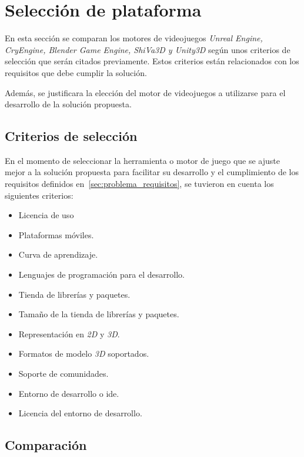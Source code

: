 \section{Selección de plataforma}
\label{sec:seleccion_plataforma}

En esta sección se comparan los motores de videojuegos \textit{Unreal Engine, CryEngine, Blender Game Engine, ShiVa3D y Unity3D} según unos criterios de selección que serán citados previamente. Estos criterios están relacionados
con los requisitos que debe cumplir la solución.

Además, se justificara la elección del motor de videojuegos a utilizarse para el desarrollo de la solución propuesta.

\subsection{Criterios de selección}

En el momento de seleccionar la herramienta o motor de juego que se ajuste mejor
a la solución propuesta para facilitar su desarrollo y el cumplimiento de los
requisitos definidos en~\ref{sec:problema_requisitos}, se tuvieron en cuenta los
siguientes criterios:


\begin{itemize}
\item Licencia de uso
\item Plataformas móviles.
\item Curva de aprendizaje.
\item Lenguajes de programación para el desarrollo.
\item Tienda de librerías y paquetes.
\item Tamaño de la tienda de librerías y paquetes.
\item Representación en \textit{2D} y \textit{3D}.
\item Formatos de modelo \textit{3D} soportados.
\item Soporte de comunidades.
\item Entorno de desarrollo o \Gls{ide}.
\item Licencia del entorno de desarrollo.
\end{itemize}


\subsection{Comparación}

